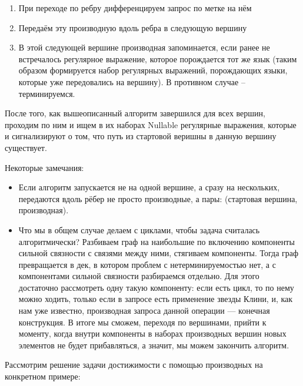 \begin{enumerate}
    \item При переходе по ребру дифференцируем запрос по метке на нём
    \item Передаём эту производную вдоль ребра в следующую вершину
    \item В этой следующей вершине производная запоминается, если ранее не встречалось регулярное выражение, которое порождается тот же язык (таким образом формируется набор регулярных выражений, порождающих языки, которые уже передовались на вершину). В противном случае -- терминируемся.
\end{enumerate}

После того, как вышеописанный алгоритм завершился для всех вершин, проходим по ним и ищем в их наборах Nullable регулярные выражения, которые и сигнализируют о том, что путь из стартовой веришны в данную вершину существует.

Некоторые замечания:

\begin{itemize}
    \item Если алгоритм запускается не на одной вершине, а сразу на нескольких, передаются вдоль рёбер не просто производные, а пары: (стартовая вершина, производная).
    \item Что мы в общем случае делаем с циклами, чтобы задача считалась алгоритмически? Разбиваем граф на наибольшие по включению компоненты сильной связности с связями между ними, стягиваем компоненты. Тогда граф превращается в дек, в котором проблем с нетерминируемостью нет, а с компонентами сильной связности разбираемся отдельно. Для этого достаточно рассмотреть одну такую компоненту: если есть цикл, то по нему можно ходить, только если в запросе есть применение звезды Клини, и, как нам уже известно, производная запроса данной операции --- конечная конструкция. В итоге мы сможем, переходя по вершинами, прийти к моменту, когда внутри компоненты в наборах производных вершин новых элементов не будет прибавляться, а значит, мы можем закончить алгоритм.
\end{itemize}

Рассмотрим решение задачи достижимости с помощью производных на конкретном примере:

